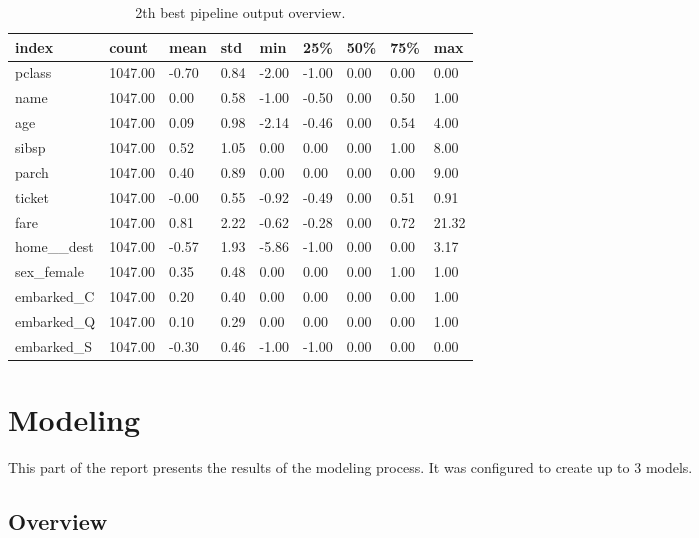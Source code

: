 \documentclass{article}%
\begin{document}
\begin{table}[H]%
\begin{center}%
\begin{tabular}{l l l l l l l l l}%
\hline%
\textbf{index}&\textbf{count}&\textbf{mean}&\textbf{std}&\textbf{min}&\textbf{25\%}&\textbf{50\%}&\textbf{75\%}&\textbf{max}\\%
\hline%
pclass&1047.00&{-}0.70&0.84&{-}2.00&{-}1.00&0.00&0.00&0.00\\%
name&1047.00&0.00&0.58&{-}1.00&{-}0.50&0.00&0.50&1.00\\%
age&1047.00&0.09&0.98&{-}2.14&{-}0.46&0.00&0.54&4.00\\%
sibsp&1047.00&0.52&1.05&0.00&0.00&0.00&1.00&8.00\\%
parch&1047.00&0.40&0.89&0.00&0.00&0.00&0.00&9.00\\%
ticket&1047.00&{-}0.00&0.55&{-}0.92&{-}0.49&0.00&0.51&0.91\\%
fare&1047.00&0.81&2.22&{-}0.62&{-}0.28&0.00&0.72&21.32\\%
home\_\_dest&1047.00&{-}0.57&1.93&{-}5.86&{-}1.00&0.00&0.00&3.17\\%
sex\_female&1047.00&0.35&0.48&0.00&0.00&0.00&1.00&1.00\\%
embarked\_C&1047.00&0.20&0.40&0.00&0.00&0.00&0.00&1.00\\%
embarked\_Q&1047.00&0.10&0.29&0.00&0.00&0.00&0.00&1.00\\%
embarked\_S&1047.00&{-}0.30&0.46&{-}1.00&{-}1.00&0.00&0.00&0.00\\%
\hline%
\end{tabular}%
\end{center}%
\caption{2th best pipeline output overview.}%
\end{table}

%
\section{Modeling}%
\label{sec:Modeling}%

%
This part of the report presents the results of the modeling process. It was configured to create up to 3 models.%
\subsection{Overview}%
\label{subsec:Overview}%

%
\end{document}

